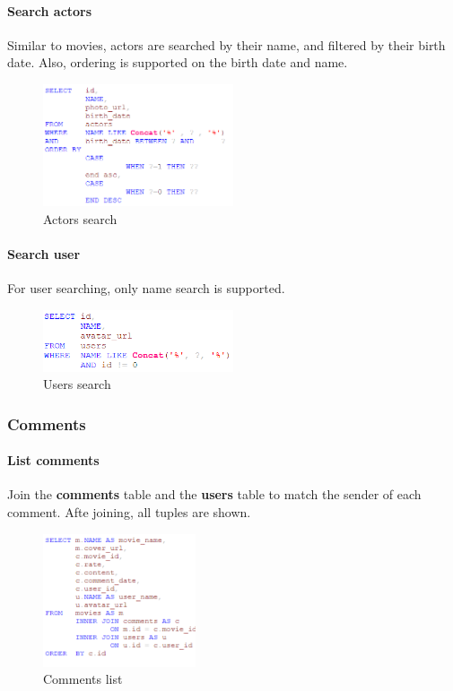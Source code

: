 \begin{CJK*}{UTF8}{gbsn}
\paragraph{Search actors}
Similar to movies, actors are searched by their name, and filtered by their birth date. Also, ordering is supported on the birth date and name.
\begin{figure}[htbp]
\centering
\includegraphics[width=0.5\textwidth]{a_search.png}
\caption{Actors search}
\end{figure}

\paragraph{Search user}
For user searching, only name search is supported.
\begin{figure}[htbp]
\centering
\includegraphics[width=0.5\textwidth]{u_search.png}
\caption{Users search}
\end{figure}

\subsubsection{Comments}
\paragraph{List comments}
Join the \textbf{comments} table and the \textbf{users} table to match the sender of each comment. Afte joining, all tuples are shown. 
\begin{figure}[h]
    \centering
    \includegraphics[width=0.4\textwidth]{comment.png}
    \caption{Comments list}
\end{figure}


\end{CJK*}
